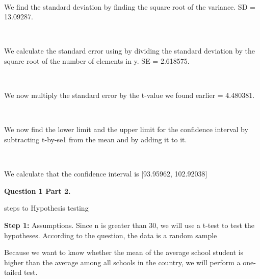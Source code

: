\documentclass[12pt,letterpaper]{article}
\begin{document}

\noindent
\\\vspace{.0cm}

\noindent
We find the standard deviation by finding the square root of the variance. SD = 13.09287.


\noindent
\\\vspace{.0cm}

\noindent
We calculate the standard error using by dividing the standard deviation by the square root of the number of elements in y. SE = 2.618575.


\noindent
\\\vspace{.0cm}

\noindent
We now multiply the standard error by the t-value we found earlier = 4.480381.


\noindent
\\\vspace{.0cm}

\noindent
We now find the lower limit and the upper limit for the confidence interval by subtracting t-by-se1 from the mean and by adding it to it.


\noindent
\\\vspace{.0cm}

\noindent
We calculate that the confidence interval is [93.95962, 102.92038]
\\\vspace{.5cm}

\newpage
\noindent
\textbf{Question 1 Part 2. }
\\\vspace{.5cm}

 steps to Hypothesis testing
\\\vspace{.5cm}

\noindent
\textbf{Step 1:} Assumptions. Since n is greater than 30, we will use a t-test to test the hypotheses. According to the question, the data is a random sample
\\\vspace{.5cm}

\noindent
Because we want to know whether the mean of the average school student is higher than the average among all schools in the country, we will perform a one-tailed test.
\\\vspace{.5cm}
\end{document}
